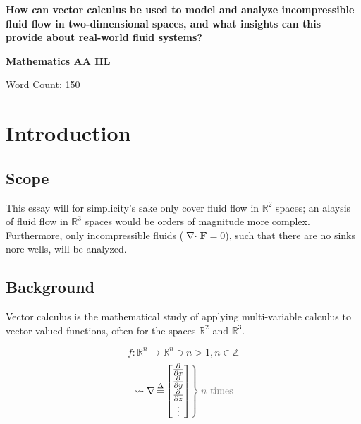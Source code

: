 \documentclass[a4paper]{article}
\newcommand{\medium}{\large} %
\newcommand{\fatf}{\mathbf{F}} %
\DeclareMathOperator{\definedas}{\stackrel{\Delta}{=}} %
\DeclareMathOperator{\divergence}{\nabla\cdot} %
\begin{document}
\begin{titlepage} %
	\begin{center}
		\vspace*{0.5cm}
		\LARGE
		\textbf{How can vector calculus be used to model and analyze incompressible fluid flow in two-dimensional spaces, and what insights can this provide about real-world fluid systems?}

		\vspace{1.5cm}
		\Large
		\textbf{Mathematics AA HL}

		\vspace{9cm}\color{darkgray}
		Word Count: 150 %
	\end{center}
\end{titlepage}

\tableofcontents\newpage %
\medium

\section{Introduction}
\subsection{Scope}
This essay will for simplicity's sake only cover fluid flow in $\mathbb{R}^2$ spaces; an alaysis of fluid flow in $\mathbb{R}^3$ spaces would be orders of magnitude more complex.
Furthermore, only incompressible fluids ($\divergence\fatf=0$), such that there are no sinks nore wells, will be analyzed.

\subsection{Background}
Vector calculus is the mathematical study of applying multi-variable calculus to vector valued functions, often for the spaces $\mathbb{R}^2$ and $\mathbb{R}^3$.

$$f:\mathbb{R}^n\rightarrow\mathbb{R}^n\ni n>1,n\in\mathbb{Z}$$
\begin{equation}
	\left.\leadsto\nabla\definedas
	\left[\begin{matrix}
		\frac{\partial}{\partial x} \\
		\frac{\partial}{\partial y} \\
		\frac{\partial}{\partial z} \\
		\vdots 					    \\
	\end{matrix}\right]
	\color{gray}\right\} \color{gray}n\text{ times}\color{black}
\end{equation}
\end{document}
